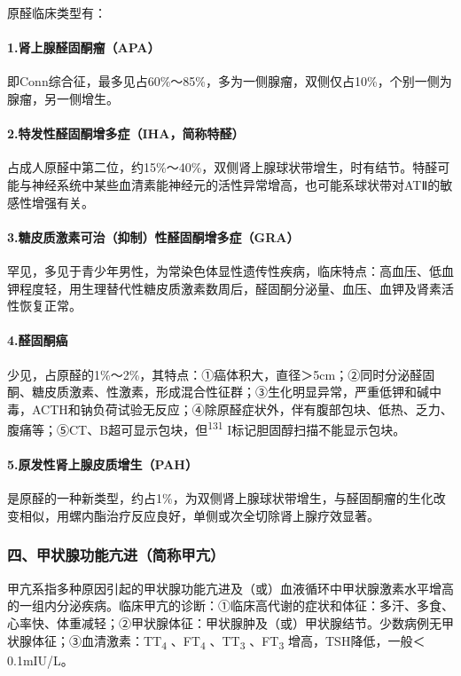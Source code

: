 原醛临床类型有：

\paragraph{1.肾上腺醛固酮瘤（APA）}

即Conn综合征，最多见占60\%～85\%，多为一侧腺瘤，双侧仅占10\%，个别一侧为腺瘤，另一侧增生。

\paragraph{2.特发性醛固酮增多症（IHA，简称特醛）}

占成人原醛中第二位，约15\%～40\%，双侧肾上腺球状带增生，时有结节。特醛可能与神经系统中某些血清素能神经元的活性异常增高，也可能系球状带对ATⅡ的敏感性增强有关。

\paragraph{3.糖皮质激素可治（抑制）性醛固酮增多症（GRA）}

罕见，多见于青少年男性，为常染色体显性遗传性疾病，临床特点：高血压、低血钾程度轻，用生理替代性糖皮质激素数周后，醛固酮分泌量、血压、血钾及肾素活性恢复正常。

\paragraph{4.醛固酮癌}

少见，占原醛的1\%～2\%，其特点：①癌体积大，直径＞5cm；②同时分泌醛固酮、糖皮质激素、性激素，形成混合性征群；③生化明显异常，严重低钾和碱中毒，ACTH和钠负荷试验无反应；④除原醛症状外，伴有腹部包块、低热、乏力、腹痛等；⑤CT、B超可显示包块，但\textsuperscript{131}
I标记胆固醇扫描不能显示包块。

\paragraph{5.原发性肾上腺皮质增生（PAH）}

是原醛的一种新类型，约占1\%，为双侧肾上腺球状带增生，与醛固酮瘤的生化改变相似，用螺内酯治疗反应良好，单侧或次全切除肾上腺疗效显著。

\subsubsection{四、甲状腺功能亢进（简称甲亢）}

甲亢系指多种原因引起的甲状腺功能亢进及（或）血液循环中甲状腺激素水平增高的一组内分泌疾病。临床甲亢的诊断：①临床高代谢的症状和体征：多汗、多食、心率快、体重减轻；②甲状腺体征：甲状腺肿及（或）甲状腺结节。少数病例无甲状腺体征；③血清激素：TT\textsubscript{4}
、FT\textsubscript{4} 、TT\textsubscript{3} 、FT\textsubscript{3}
增高，TSH降低，一般＜0.1mIU/L。

